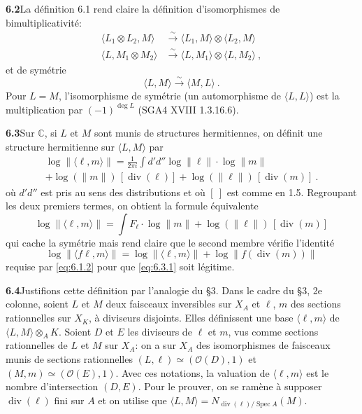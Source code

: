 \documentclass[12pt,a4paper]{article}
\theoremstyle{plain}
\theoremstyle{definition}
\theoremstyle{remark}
\DeclareMathOperator{\divm}{div}
\DeclareMathOperator{\Spec}{Spec}
\newcommand{\bbC}{\mathbb{C}}
\newcommand{\calO}{\mathcal{O}}
\newcommand{\simto}{\xrightarrow{\sim}}
\begin{document}
\medskip
\noindent\textbf{6.2}\quad La d\'efinition 6.1 rend claire la d\'efinition d'isomorphismes de bimultiplicativit\'e:
\begin{align*}
\langle L_1 \otimes L_2, M \rangle &\simto \langle L_1, M \rangle \otimes \langle L_2, M \rangle \\
\langle L, M_1 \otimes M_2 \rangle &\simto \langle L, M_1 \rangle \otimes \langle L, M_2 \rangle \ ,
\end{align*}
et de sym\'etrie
\[
\langle L, M \rangle \simto \langle M, L \rangle \ .
\]
Pour $L = M$, l'isomorphisme de sym\'etrie (un automorphisme de $\langle L, L \rangle$) est la multiplication par $(-1)^{\deg L}$ (SGA4 XVIII 1.3.16.6).

\medskip
\noindent\textbf{6.3}\quad Sur $\bbC$, si $L$ et $M$ sont munis de structures hermitiennes, on d\'efinit une structure hermitienne sur $\langle L, M \rangle$ par
\begin{equation}
\label{eq:6.3.1}
\begin{aligned}
\log \| \langle \ell, m \rangle \| = \frac{1}{2\pi i} \int d'd'' \log \|\ell\| \cdot \log \|m\| \\
+ \log(\|m\|) \, [\divm(\ell)] + \log(\|\ell\|) \, [\divm(m)] \ .
\end{aligned}
\end{equation}
o\`u $d'd''$ est pris au sens des distributions et o\`u $[\ ]$ est comme en 1.5. Regroupant les deux premiers termes, on obtient la formule \'equivalente
\begin{equation}
\label{eq:6.3.2}
\log \| \langle \ell, m \rangle \| = \int F_\ell \cdot \log \|m\| + \log(\|\ell\|) \, [\divm(m)]
\end{equation}
qui cache la sym\'etrie mais rend claire que le second membre v\'erifie l'identit\'e
\[
\log \| \langle f\ell, m \rangle \| = \log \| \langle \ell, m \rangle \| + \log \|f(\divm(m))\|
\]
requise par \eqref{eq:6.1.2} pour que \eqref{eq:6.3.1} soit l\'egitime.

\medskip
\noindent\textbf{6.4}\quad Justifions cette d\'efinition par l'analogie du \S 3. Dans le cadre du \S 3, 2e colonne, soient $L$ et $M$ deux faisceaux inversibles sur $X_A$ et $\ell$, $m$ des sections rationnelles sur $X_K$, \`a diviseurs disjoints. Elles d\'efinissent une base $\langle \ell, m \rangle$ de $\langle L, M \rangle \otimes_A K$. Soient $D$ et $E$ les diviseurs de $\ell$ et $m$, vus comme sections rationnelles de $L$ et $M$ sur $X_A$: on a sur $X_A$ des isomorphismes de faisceaux munis de sections rationnelles $(L, \ell) \simeq (\calO(D), 1)$ et $(M, m) \simeq (\calO(E), 1)$. Avec ces notations, la valuation de $\langle \ell, m \rangle$ est le nombre d'intersection $(D, E)$. Pour le prouver, on se ram\`ene \`a supposer $\divm(\ell)$ fini sur $A$ et on utilise que $\langle L, M \rangle = N_{\divm(\ell)/\Spec A}(M)$.
\end{document}
